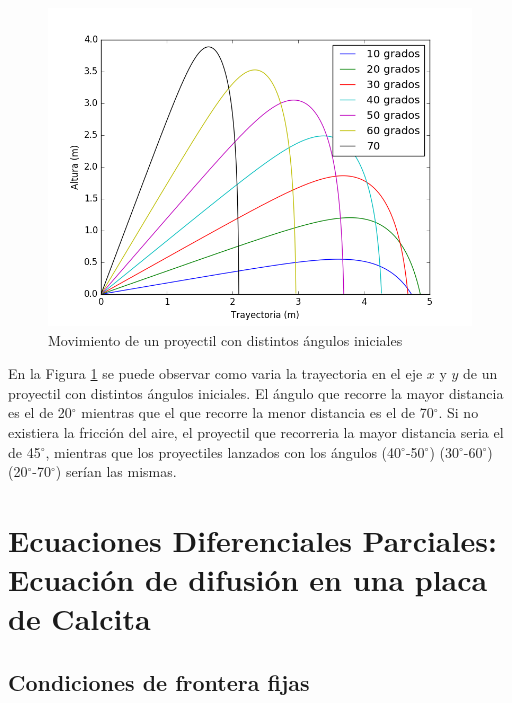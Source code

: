 \documentclass[]{article}
\begin{document}
\begin{figure}[H]
    \centering
    \includegraphics[width = \linewidth]{proyectilangulos.png}
    \caption{Movimiento de un proyectil con distintos ángulos iniciales}
    \label{fig:protectilangulos}
\end{figure}
En la Figura \ref{fig:protectilangulos} se puede observar como varia la trayectoria en el eje $x$ y $y$ de un proyectil con distintos ángulos iniciales. El ángulo que recorre la mayor distancia es el de 20$^\circ$ mientras que el que recorre la menor distancia es el de 70$^\circ$. Si no existiera la fricción del aire, el proyectil que recorreria la mayor distancia seria el de 45$^\circ$, mientras que los proyectiles lanzados con los ángulos (40$^\circ$-50$^\circ$) (30$^\circ$-60$^\circ$) (20$^\circ$-70$^\circ$) serían las mismas.

\section{Ecuaciones Diferenciales Parciales: Ecuación de difusión en una placa de Calcita}
\subsection{Condiciones de frontera fijas}
\end{document}
